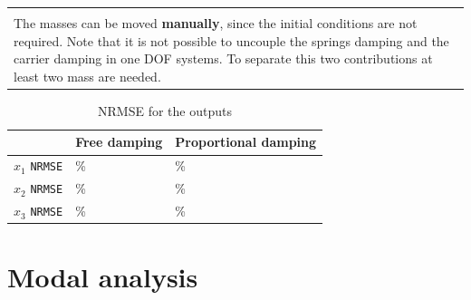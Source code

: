 \documentclass[twosided,a4paper]{article}           %
\newcommand*{\TakeFourierOrnament}[1]{{%
		\fontencoding{U}\fontfamily{futs}\selectfont\char#1}}    %
\newcommand*{\danger}{\TakeFourierOrnament{66}}                  %
\begin{document}
\begin{center}
	\begin{tabular}{|p{\linewidth}|}
		\hline  \\
	{
	The masses can be moved \textbf{manually}, since the initial conditions are not required. \danger Note that it is not possible to uncouple the springs damping and the carrier damping in one DOF systems. To separate this two contributions at least two mass are needed.
	}
	\\ \hline
\end{tabular} 
\end{center}


\begin{table}[H]
	\centering
	\caption{NRMSE for the outputs}
	\label{tab:fit_all}
	\begin{tabular}{l|l|l|}
		\cline{2-3}
		& Free damping  & Proportional damping \\ \hline
		\multicolumn{1}{|l|}{$x_1$ \texttt{NRMSE} } &  \%        &          \%             \\ \hline
		\multicolumn{1}{|l|}{$x_2$ \texttt{NRMSE} } &   \%             &        \%           \\ \hline
		\multicolumn{1}{|l|}{$x_3$ \texttt{NRMSE} } &    \%  &
		 \%                              \\ \hline
	\end{tabular}
\end{table}
\section{Modal analysis}
\end{document}
